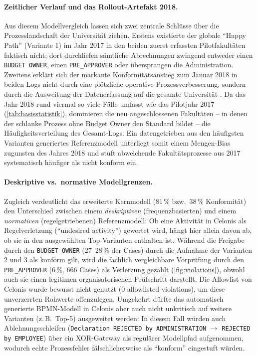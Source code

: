 \paragraph{Zeitlicher Verlauf und das Rollout-Artefakt 2018.}
Aus diesem Modellvergleich lassen sich zwei zentrale Schlüsse über die Prozesslandschaft der Universität ziehen. Erstens existierte der globale \enquote{Happy Path} (Variante 1) im Jahr 2017 in den beiden zuerst erfassten Pilotfakultäten faktisch nicht; dort durchliefen sämtliche Abrechnungen zwingend entweder einen \texttt{BUDGET OWNER}, einen \texttt{PRE\_APPROVER} oder übersprangen die Administration. Zweitens erklärt sich der markante Konformitätsanstieg zum Januar 2018 in beiden Logs nicht durch eine plötzliche operative Prozessverbesserung, sondern durch die Ausweitung der Datenerfassung auf die gesamte Universität \parencite{van_dongen_bpi_2020}. Da das Jahr 2018 rund viermal so viele Fälle umfasst wie das Pilotjahr 2017 (\autoref{tab:basisstatistik}), dominieren die neu angeschlossenen Fakultäten – in denen der schlanke Prozess ohne Budget Owner den Standard bildet – die Häufigkeitsverteilung des Gesamt-Logs. Ein datengetrieben aus den häufigsten Varianten generiertes Referenzmodell unterliegt somit einem Mengen-Bias zugunsten des Jahres 2018 und stuft abweichende Fakultätsprozesse aus 2017 systematisch häufiger als nicht konform ein.

\paragraph{Deskriptive vs.\ normative Modellgrenzen.}
Zugleich verdeutlicht das erweiterte Kernmodell (81\,\% bzw.\ 38\,\% Konformität) den Unterschied zwischen einem \emph{deskriptiven} (frequenzbasierten) und einem \emph{normativen} (regelgetriebenen) Referenzmodell: Ob eine Aktivität in Celonis als Regelverletzung (\enquote{undesired activity}) gewertet wird, hängt hier allein davon ab, ob sie in den ausgewählten Top-Varianten enthalten ist. Während die Freigabe durch den \texttt{BUDGET OWNER} (27--28\,\% der Cases) durch die Aufnahme der Varianten 2 und 3 als konform gilt, wird die fachlich vergleichbare Vorprüfung durch den \texttt{PRE\_APPROVER} (6\,\%, 666 Cases) als Verletzung gezählt (\autoref{fig:violations}), obwohl auch sie einen legitimen organisatorischen Prüfschritt darstellt. Die Allowlist von Celonis wurde bewusst nicht genutzt (0 allowlisted violations), um diese unverzerrten Rohwerte offenzulegen. Umgekehrt dürfte das automatisch generierte BPMN-Modell in Celonis aber auch nicht unkritisch auf weitere Varianten (z.\,B.\ Top-5) ausgeweitet werden: In diesem Fall würden auch Ablehnungsschleifen (\texttt{Declaration REJECTED by ADMINISTRATION} $\rightarrow$ \texttt{REJECTED by EMPLOYEE}) über ein XOR-Gateway als regulärer Modellpfad aufgenommen, wodurch echte Prozessfehler fälschlicherweise als \enquote{konform} eingestuft würden.

